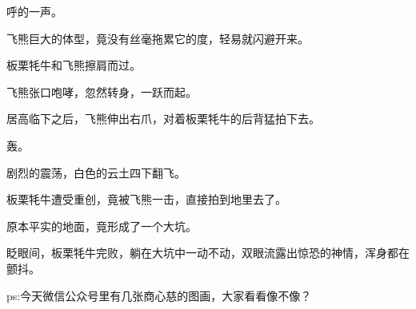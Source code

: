 \begin{this_body}
呼的一声。

飞熊巨大的体型，竟没有丝毫拖累它的度，轻易就闪避开来。

板栗牦牛和飞熊擦肩而过。

飞熊张口咆哮，忽然转身，一跃而起。

居高临下之后，飞熊伸出右爪，对着板栗牦牛的后背猛拍下去。

轰。

剧烈的震荡，白色的云土四下翻飞。

板栗牦牛遭受重创，竟被飞熊一击，直接拍到地里去了。

原本平实的地面，竟形成了一个大坑。

眨眼间，板栗牦牛完败，躺在大坑中一动不动，双眼流露出惊恐的神情，浑身都在颤抖。

ps:今天微信公众号里有几张商心慈的图画，大家看看像不像？

\end{this_body}

